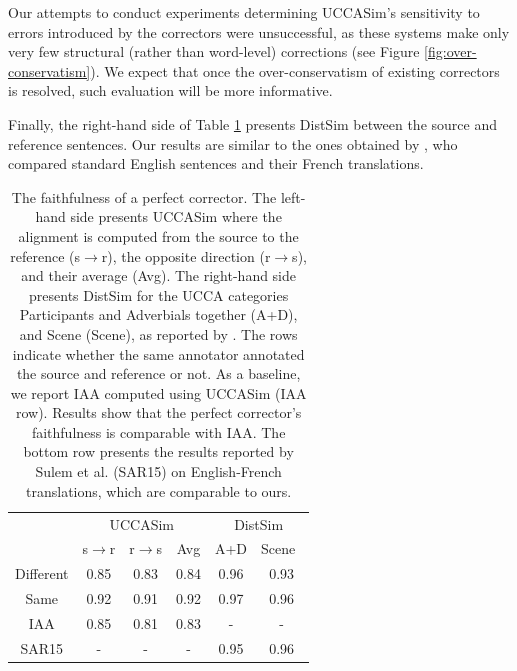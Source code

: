 \documentclass[letterpaper, 11pt]{article}
\begin{document}
Our attempts to conduct experiments determining {\sc UCCASim}'s sensitivity to
errors introduced by the correctors were
unsuccessful, as these systems make only very few structural (rather than word-level)
corrections (see Figure \ref{fig:over-conservatism}).
We expect that once the over-conservatism of existing correctors is resolved,
such evaluation will be more informative.
%

Finally, the right-hand side of Table \ref{tab:Distances} presents {\sc DistSim}
between the source and reference sentences.
Our results are similar to the ones obtained by ,
who compared standard English sentences and their French translations.
\begin{table}
	\vspace{-0.5cm}
  \small
  \centering
  \singlespacing
  \begin{tabular}{c|c|c|c||c|c|}
  	\cline{2-6} 
  	& \multicolumn{3}{c||}{\sc UCCASim} & \multicolumn{2}{c|}{\sc DistSim}\\ \cline{2-6}
  	& s$\rightarrow$r & r$\rightarrow$s & Avg & A+D & Scene\
    \\
    \hline
    Different & 0.85 & 0.83 & 0.84 & 0.96 & 0.93
    \\
    Same & 0.92 & 0.91 & 0.92 & 0.97 & 0.96
    \\
    \hline
    \hline
    IAA & 0.85 & 0.81 & 0.83 & - & -
    \\
    \hline
    SAR15 & - & - & - & 0.95 & 0.96 \\
    \hline
  \end{tabular}
  \caption{\label{tab:Distances}
    The faithfulness of a perfect corrector. The left-hand side presents {\sc UCCASim}
    where the alignment is computed from the source to the reference (s$\rightarrow$r), the opposite direction
    (r$\rightarrow$s), and their average (Avg).
    The right-hand side presents {\sc DistSim} for the UCCA categories Participants and Adverbials
    together (A+D), and Scene (Scene), as reported by \newcite{sulem2015conceptual}.
    The rows indicate whether the same annotator annotated the source and reference or not. As a baseline, we report IAA computed using {\sc UCCASim} (IAA row).
    Results show that the perfect corrector's faithfulness is comparable with IAA.
    The bottom row presents the results reported by Sulem et al. (SAR15) on English-French
    translations, which are comparable to ours.}
\vspace{-0.6cm}
\end{table}
\end{document}
